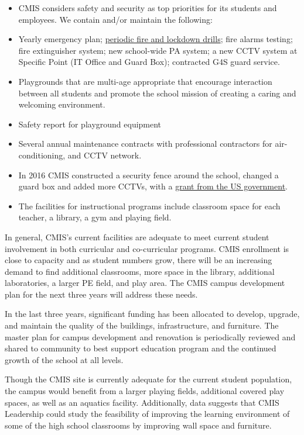 \begin{findings}
\begin{itemize}
\item CMIS considers safety and security as top priorities for its students and employees. We contain and/or maintain the following:
\item Yearly emergency plan; \href{https://docs.google.com/document/d/1bWb3k7yCv7oRx52dS9tLZe_e0DhaAsxz8f1OxJD2-is/edit}{periodic fire and lockdown drills}; fire alarms testing; fire extinguisher system; new school-wide PA system; a new CCTV system at Specific Point (IT Office and Guard Box); contracted G4S guard service.
\item Playgrounds that are multi-age appropriate that encourage interaction between all students and promote the school mission of creating a caring and welcoming environment.
\item Safety report for playground equipment
\item Several annual maintenance contracts with professional contractors for air-conditioning, and CCTV network.
\item In 2016 CMIS constructed a security fence around the school, changed a guard box and added more CCTVs, with a \href{http://blogs.cmis.ac.th/newsletter/2016/05/13/service-of-thanksgiving-for-the-security-wall-grant-given-by-the-united-states-of-america/}{grant from the US government}.
\item The facilities for instructional programs include classroom space for each teacher, a library, a gym and playing field. 
\end{itemize}


In general, CMIS’s current facilities are adequate to meet current student involvement in both curricular and co-curricular programs. CMIS enrollment is close to capacity and as student numbers grow, there will be an increasing demand to find additional classrooms, more space in the library, additional laboratories, a larger PE field, and play area. The CMIS campus development plan for the next three years will address these needs.

In the last three years, significant funding has been allocated to develop, upgrade, and maintain the quality of the buildings, infrastructure, and furniture. The master plan for campus development and renovation is periodically reviewed and shared to community to best support education program and the continued growth of the school at all levels.


Though the CMIS site is currently adequate for the current student population, the campus would benefit from a larger playing fields, additional covered play spaces, as well as an aquatics facility. Additionally, data suggests that CMIS Leadership could study the feasibility of improving the learning environment of some of the high school classrooms by improving wall space and furniture. 
\end{findings}

